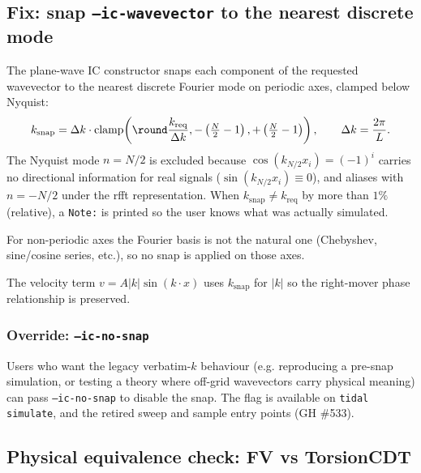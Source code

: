 \subsection{Fix: snap \texttt{--ic-wavevector} to the nearest discrete mode}
\label{sec:pw-snap}

The plane-wave IC constructor snaps each component of the requested
wavevector to the nearest discrete Fourier mode on periodic axes,
clamped below Nyquist:
\begin{equation}
  k_{\mathrm{snap}} = \Delta k \cdot
    \mathrm{clamp}\!\left(\round\frac{k_{\mathrm{req}}}{\Delta k},
                          -\left(\tfrac{N}{2}-1\right),
                          +\left(\tfrac{N}{2}-1\right)\right),
  \qquad \Delta k = \frac{2\pi}{L}.
  \label{eq:snap-formula}
\end{equation}
The Nyquist mode $n = N/2$ is excluded because $\cos(k_{N/2} x_i) = (-1)^i$
carries no directional information for real signals
($\sin(k_{N/2} x_i) \equiv 0$), and aliases with $n = -N/2$ under the
rfft representation. When
$k_{\mathrm{snap}} \neq k_{\mathrm{req}}$ by more than $1\%$ (relative), a
\texttt{Note:} is printed so the user knows what was actually simulated.

For non-periodic axes the Fourier basis is not the natural one
(Chebyshev, sine/cosine series, etc.), so no snap is applied on those
axes.

The velocity term $v = A |k| \sin(k \cdot x)$ uses $k_{\mathrm{snap}}$
for $|k|$ so the right-mover phase relationship is preserved.

\subsubsection{Override: \texttt{--ic-no-snap}}

Users who want the legacy verbatim-$k$ behaviour (e.g. reproducing a
pre-snap simulation, or testing a theory where off-grid wavevectors
carry physical meaning) can pass \texttt{--ic-no-snap} to disable the
snap. The flag is available on \texttt{tidal simulate},
and the retired sweep and sample entry points (GH \#533).

\subsection{Physical equivalence check: FV vs TorsionCDT}
\label{sec:pw-fv-vs-cdt}

